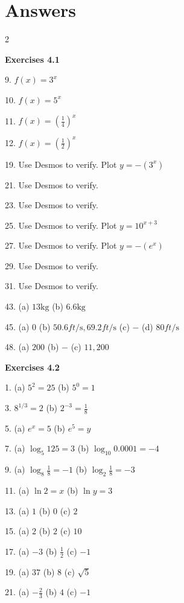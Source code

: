 \section{Answers}
\columnsep =30pt
\begin {multicols}{2}
 

\textbf{Exercises 4.1} 

9. $f (x) =3^{x}$ 

10. $f (x) =5^{x}$ 

11. $f (x) =\genfrac{(}{)}{}{}{1}{4}^{x}$ 

12. $f (x) =\genfrac{(}{)}{}{}{1}{2}^{x}$ 

19. Use Desmos to verify. Plot $y = -(3^{x})$ 

21. Use Desmos to verify. 

23. Use Desmos to verify. 

25. Use Desmos to verify. Plot $y =10^{x +3}$ 

27. Use Desmos to verify. Plot $y = -(e^{x})$ 

29. Use Desmos to verify. 

31. Use Desmos to verify. 

43. (a)
$13 \mbox{kg}$ (b) $6.6 \mbox{kg}$ 

45. (a) $0$ (b) $50.6 ft/\mbox{s} ,69.2 ft/\mbox{s}$ (c) $ -$ (d) $80 ft/\mbox{s}$ 

48. (a) $200$ (b) $ -$ (c) $11,200$ 

\textbf{Exercises 4.2} 

1. (a) $5^{2} =25$ (b) $5^{0} =1$ 

3. $8^{1/3} =2$ (b) $2^{ -3} =\frac{1}{8}$ 

5. (a) $e^{x} =5$ (b) $e^{5} =y$ 

7. (a) $\log _{5} 125 =3$ (b) $\log _{10} 0.0001 = -4$ 

9. (a) $\log _{8} \frac{1}{8} = -1$ (b) $\log _{2} \frac{1}{8} = -3$ 

11. (a) $\ln  2 =x$ (b) $\ln  y =3$ 

13. (a) $1$ (b) $0$ (c) $2$ 

15. (a) $2$ (b) $2$ (c) $10$ 

17. (a) $ -3$ (b) $\frac{1}{2}$ (c) $ -1$ 

19. (a) $37$ (b) $8$ (c) $\sqrt{5}$ 

21. (a) $ -\frac{2}{3}$ (b) $4$ (c) $ -1$ 


\end{multicols}
